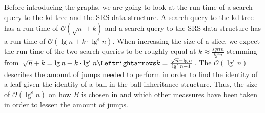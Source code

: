 Before introducing the graphs, we are going to look at the run-time of a search query to the kd-tree and the SRS data structure. A search query to the kd-tree has a run-time of $\mathcal{O}(\sqrt{n}+k)$ and a search query to the SRS data structure has a run-time of $\mathcal{O}(\lg n + k \cdot \lg^\epsilon n)$. When increasing the size of a slice, we expect the run-time of the two search queries to be roughly equal at $k \approx \frac{sqrt{n}}{lg^\epsilon n}$ stemming from $\sqrt{n} + k = \lg n + k \cdot \lg^\epsilon n \Leftrightarrows k = \frac{\sqrt{n} - \lg n}{\lg^\epsilon n - 1}$. The $\mathcal{O}(\lg^\epsilon n)$ describes the amount of jumps needed to perform in order to find the identity of a leaf given the identity of a ball in the ball inheritance structure. Thus, the size of $\mathcal{O}(\lg^\epsilon n)$ on how $B$ is chosen in  and which other meassures have been taken in order to lessen the amount of jumps. 
